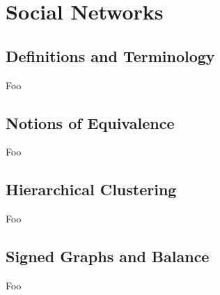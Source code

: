 \section{Social Networks}

\subsection{Definitions and Terminology}

Foo

\subsection{Notions of Equivalence}

Foo

\subsection{Hierarchical Clustering}

Foo

\subsection{Signed Graphs and Balance}

Foo

